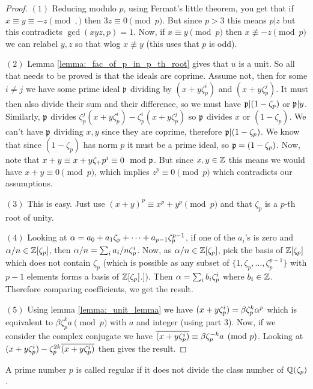 \begin{proof}
	
	
	$(1)$  Reducing modulo $p$, using Fermat's little theorem, you get that if $x \equiv y \equiv -z \pmod,$ then $3z \equiv 0 \pmod p$. But since $p >3$ this means $p |z$ but this contradicts $\gcd(xyz,p)=1$. Now, if $x \equiv y \pmod p$ then  $x \not \equiv -z \pmod p$ we can relabel $y,z$ so that wlog $x \not \equiv y$ (this uses that $p$ is odd). 
	
	
	$(2)$  Lemma \ref{lemma:_fac_of_p_in_p_th_root} gives that $u$ is a unit. So all that needs to be proved is that the ideals are coprime. Assume not, then for some $i \neq j$ we have some prime ideal $\mathfrak{p}$ dividing by $(x+y\zeta_p^i)$ and $(x+y\zeta_p^j)$. It must then also divide their sum and their difference, so we must have $\mathfrak{p} | (1-\zeta_p)$ or $\mathfrak{p} | y$. Similarly, $\mathfrak{p}$ divides $\zeta_p^j(x+y\zeta_p^i)-\zeta_p^i(x+y\zeta_p^j)$ so $\mathfrak{p}$ divides $x$ or $(1-\zeta_p)$. We can't have $\mathfrak{p}$ dividing $x,y$ since they are coprime, therefore $\mathfrak{p} |(1-\zeta_p)$. We know that since $(1-\zeta_p)$ has norm $p$ it must be a prime ideal, so $\mathfrak{p}=(1-\zeta_p)$. Now, note that $x+y \equiv x+y\zeta_+p^i \equiv 0 \mod {\mathfrak{p}}$. But since $x,y \in \mathbb{Z}$ this means we would have $x+y \equiv 0 \pmod p$, which implies $z^p \equiv 0 \pmod p$ which contradicts our assumptions.
	
	$(3)$ This is easy. Just use $(x+y)^p \equiv x^p + y^p \pmod p$ and that $\zeta_p$ is a $p$-th root of unity.
	
	$(4)$  Looking at $\alpha=a_0+a_1\zeta_p+\cdots+a_{p-1}\zeta_p^{p-1}$, if one of the $a_i$'s is zero and $\alpha/n \in \mathbb{Z}[\zeta_p]$, then $\alpha/n=\sum_i a_i/n \zeta_p^i$. Now, as $\alpha/n \in \mathbb{Z}[\zeta_p]$, pick the basis of $\mathbb{Z}[\zeta_p]$ which does not contain $\zeta_p$ (which is possible as any subset of $\{1,\zeta_p,\dots,\zeta_p^{p-1}\}$ with $p-1$ elements forms a basis of $\mathbb{Z}[\zeta_p]$.]). Then $\alpha=\sum_i b_i \zeta_p^i$ where $b_i \in \mathbb{Z}$. Therefore comparing coefficients, we get the result.
	
	$(5)$  Using lemma \ref{lemma:_unit_lemma} we have $(x+y\zeta_p^i) =\beta \zeta_p^k \alpha^p$ which is equivalent to $\beta \zeta_p^k a \pmod p$ with $a$ and integer (using part $3$). Now, if we consider the complex conjugate we have $\overline{(x+y\zeta_p^i)  }\equiv \beta \zeta_p^{-k}a \pmod p$. Looking at $(x+y\zeta_p^i)-\zeta_p^{2k}\overline{(x+y\zeta_p^i)  }$ then gives the result.
\end{proof}

\begin{definition}\label{defn:_is_regular_number}
	\leanok
	A prime number $p$ is called regular if it does not divide the class number of $\mathbb{Q}(\zeta_p)$.
\end{definition}


